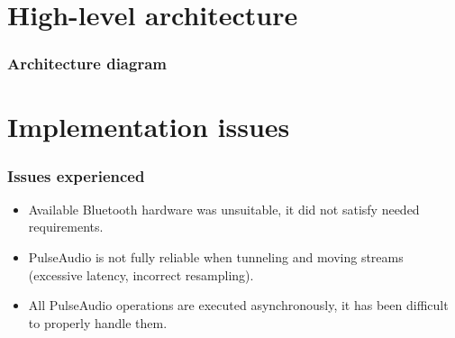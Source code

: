 \documentclass{beamer}
\begin{document}

\section{High-level architecture}

\begin{frame}
\frametitle{Architecture diagram}
\begin{center}
\end{center}
\end{frame}


\section{Implementation issues}

\begin{frame}
\frametitle{Issues experienced}
\begin{itemize}
\setlength{\itemsep}{5mm}
	\item Available Bluetooth hardware was unsuitable, it did not satisfy needed requirements.
	\pause
	\item PulseAudio is not fully reliable when tunneling and moving streams (excessive latency, incorrect resampling).
	\pause
	\item All PulseAudio operations are executed asynchronously, it has been difficult to properly handle them.
\end{itemize}
\end{frame}
\end{document}
